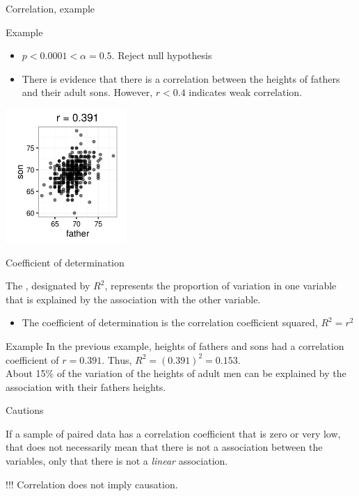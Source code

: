 \documentclass[xcolor=table]{beamer}
\begin{document}
\begin{frame}{Correlation, example}
\begin{exampleblock}{Example}
\begin{itemize}
\item $p < 0.0001 < \alpha = 0.5$. Reject null hypothesis
\item There is evidence that there is a correlation between the heights of fathers and their adult sons. However, $r < 0.4$ indicates weak correlation.
\end{itemize} 
\end{exampleblock}
\medskip
{\centering
\includegraphics[width=1.8in]{../images/ch10_cor_galton}
\par}
\end{frame}

\begin{frame}{Coefficient of determination}
\begin{block}{}
\large
The , designated by $R^2$, represents the proportion of variation in one variable that is explained by the association with the other variable.
\begin{itemize}
\item The coefficient of determination is the correlation coefficient squared,  $R^2 = r^2$
\end{itemize}
\end{block}

\pause
\begin{exampleblock}{Example}
\large
In the previous example, heights of fathers and sons had a correlation coefficient of $r=0.391$. Thus, $R^2 = (0.391)^2 = 0.153$.\\
\medskip
About 15\% of the variation of the heights of adult men can be explained by the association with their fathers heights.
\end{exampleblock}
\end{frame}

\begin{frame}{Cautions}
\begin{block}{}
\large
If a sample of paired data has a correlation coefficient that is zero or very low, that does not necessarily mean that there is not a association between the variables, only that there is not a \emph{linear} association. 
\end{block}

\pause
\begin{alertblock}{!!!}
\Large
Correlation does not imply causation.
\end{alertblock}
\end{frame}
\end{document}
